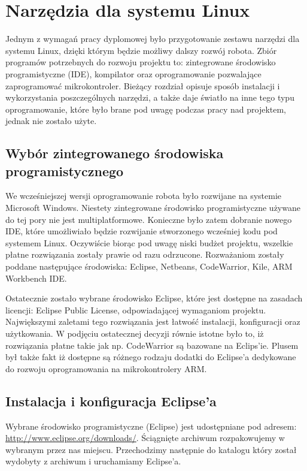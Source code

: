 \section{Narzędzia dla systemu Linux}
Jednym z wymagań pracy dyplomowej było przygotowanie zestawu narzędzi dla systemu
Linux, dzięki którym będzie możliwy dalszy rozwój robota. Zbiór programów
potrzebnych do rozwoju projektu to: zintegrowane środowisko programistyczne
(IDE), kompilator oraz oprogramowanie pozwalające zaprogramować mikrokontroler.
Bieżący rozdział opisuje sposób instalacji i wykorzystania poszczególnych
narzędzi, a także daje światło na inne tego typu oprogramowanie, które było brane
pod uwagę podczas pracy nad projektem, jednak nie zostało użyte.

\subsection{Wybór zintegrowanego środowiska programistycznego}
We wcześniejszej wersji oprogramowanie robota było rozwijane na systemie
Microsoft Windows. Niestety zintegrowane środowisko programistyczne używane do
tej pory nie jest multiplatformowe. Konieczne było zatem dobranie nowego IDE,
które umożliwiało będzie rozwijanie stworzonego wcześniej kodu pod systemem
Linux. Oczywiście biorąc pod uwagę niski budżet projektu, wszelkie płatne
rozwiązania zostały prawie  od razu odrzucone. Rozważaniom zostały poddane
następujące środowiska: Eclipse, Netbeans, CodeWarrior, Kile, ARM Workbench IDE.

Ostatecznie zostało wybrane środowisko Eclipse, które jest dostępne na zasadach
licencji: Eclipse Public License, odpowiadającej wymaganiom projektu.
Największymi zaletami tego rozwiązania jest łatwość instalacji, konfiguracji oraz
użytkowania. W podjęciu ostatecznej decyzji równie istotne było to, iż
rozwiązania płatne takie jak np. CodeWarrior są bazowane na Eclips'ie. Plusem był
także fakt iż dostępne są różnego rodzaju dodatki do Eclipse'a dedykowane do
rozwoju oprogramowania na mikrokontrolery ARM.

\subsection{Instalacja i konfiguracja Eclipse'a}
Wybrane środowisko programistyczne (Eclipse) jest udostępniane pod adresem:
\url{http://www.eclipse.org/downloads/}. Ściągnięte archiwum rozpakowujemy w
wybranym przez nas miejscu. Przechodzimy następnie do katalogu który został
wydobyty z archiwum i uruchamiamy Eclipse'a.

